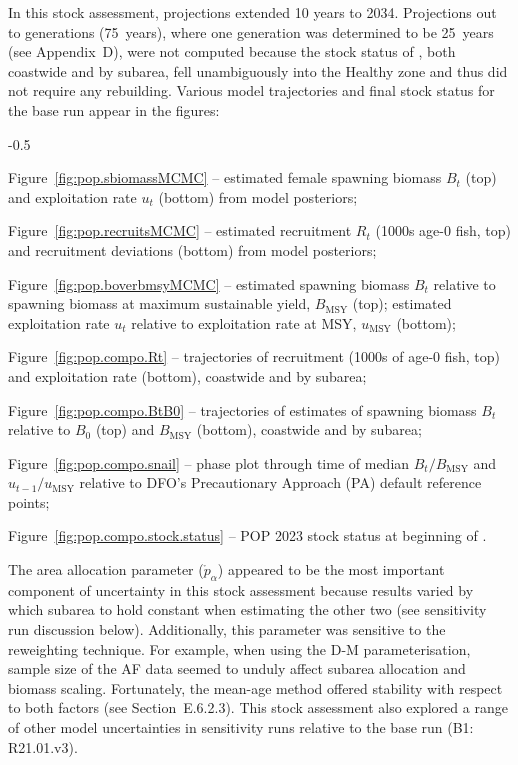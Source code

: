 \documentclass[11pt]{book}
\newcommand{\Bmsy}{B_\text{MSY}}
\newcommand{\umsy}{u_\text{MSY}}
\begin{document}
In this stock assessment, projections extended 10 years to 2034. 
Projections out to  generations (75~years), where one generation was determined to be 25~years (see Appendix~D), were not computed because the stock status of \SPC{}, both coastwide and by subarea, fell unambiguously into the Healthy zone and thus did not require any rebuilding.
Various model trajectories and final stock status for the base run appear in the figures:
\begin{itemize_csas}{-0.5}{}
	\item Figure~\ref{fig:pop.sbiomassMCMC}    -- estimated female spawning biomass $B_t$ (top) and exploitation rate $u_t$ (bottom) from model posteriors;
	\item Figure~\ref{fig:pop.recruitsMCMC}      -- estimated recruitment $R_t$ (1000s age-0 fish, top) and recruitment deviations (bottom) from model posteriors;
	\item Figure~\ref{fig:pop.boverbmsyMCMC} -- estimated spawning biomass $B_t$ relative to spawning biomass at maximum sustainable yield, $\Bmsy$ (top); estimated exploitation rate $u_t$ relative to exploitation rate at MSY, $\umsy$ (bottom);
	\item Figure~\ref{fig:pop.compo.Rt} -- trajectories of recruitment (1000s of age-0 fish, top) and exploitation rate (bottom), coastwide and by subarea;
	\item Figure~\ref{fig:pop.compo.BtB0} -- trajectories of estimates of spawning biomass $B_t$ relative to $B_0$ (top) and $\Bmsy$ (bottom), coastwide and by subarea;
	\item Figure~\ref{fig:pop.compo.snail}  -- phase plot through time of median $B_t/\Bmsy$ and $u_{t-1}/\umsy$ relative to DFO's Precautionary Approach (PA) default reference points;
	\item Figure~\ref{fig:pop.compo.stock.status} -- POP 2023 stock status at beginning of \currYear{}.
\end{itemize_csas}

The area allocation parameter ($\mathring{p}_{\alpha}$) appeared to be the most important component of uncertainty in this stock assessment because results varied by which subarea to hold constant when estimating the other two (see sensitivity run discussion below).
Additionally, this parameter was sensitive to the reweighting technique.
For example, when using the D-M parameterisation, sample size of the AF data seemed to unduly affect subarea allocation and biomass scaling.
Fortunately, the \citet{Francis:2011} mean-age method offered stability with respect to both factors (see Section~E.6.2.3).
This stock assessment also explored a range of other model uncertainties in sensitivity runs relative to the base run (B1: R21.01.v3).
\end{document}
